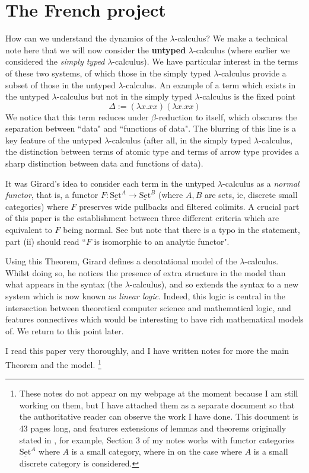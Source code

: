 \documentclass[12pt]{article}
\theoremstyle{plain}
\theoremstyle{definition}
\newcommand{\lto}{\longrightarrow}
\newcommand{\set}{\operatorname{\underline{Set}}}
\begin{document}
	\section{The French project}\label{sec:french}
	How can we understand the dynamics of the $\lambda$-calculus? We make a technical note here that we will now consider the \textbf{untyped} $\lambda$-calculus (where earlier we considered the \emph{simply typed} $\lambda$-calculus). We have particular interest in the terms of these two systems, of which those in the simply typed $\lambda$-calculus provide a subset of those in the untyped $\lambda$-calculus. An example of a term which exists in the untyped $\lambda$-calculus but not in the simply typed $\lambda$-calculus is the fixed point
	\begin{equation}
		\Delta := (\lambda x. xx)(\lambda x. xx)
		\end{equation}
	We notice that this term reduces under $\beta$-reduction to itself, which obscures the separation between ``data" and ``functions of data". The blurring of this line is a key feature of the untyped $\lambda$-calculus (after all, in the simply typed $\lambda$-calculus, the distinction between terms of atomic type and terms of arrow type provides a sharp distinction between data and functions of data).
	
	It was Girard's idea \cite{Girard} to consider each term in the untyped $\lambda$-calculus as a \emph{normal functor}, that is, a functor $F: \set^A \lto \set^B$ (where $A,B$ are sets, ie, discrete small categories) where $F$ preserves wide pullbacks and filtered colimits. A crucial part of this paper is the establishment between three different criteria which are equivalent to $F$ being normal. See \cite[Theorem 2.8]{Girard} but note that there is a typo in the statement, part (ii) should read ``$F$ is isomorphic to an analytic functor".
	
	Using this Theorem, Girard defines a denotational model of the $\lambda$-calculus. Whilst doing so, he notices the presence of extra structure in the model than what appears in the syntax (the $\lambda$-calculus), and so extends the syntax to a new system which is now known as \emph{linear logic}. Indeed, this logic is central in the intersection between theoretical computer science and mathematical logic, and features connectives which would be interesting to have rich mathematical models of. We return to this point later.
	
	I read this paper very thoroughly, and I have written notes for more the main Theorem and the model. \footnote{These notes do not appear on my webpage at the moment because I am still working on them, but I have attached them as a separate document so that the authoritative reader can observe the work I have done. This document is 43 pages long, and features extensions of lemmas and theorems originally stated in \cite{Girard}, for example, Section 3 of my notes works with functor categories $\set^A$ where $A$ is a small category, where in \cite{Girard} on the case where $A$ is a small discrete category is considered.}
	
\end{document}
